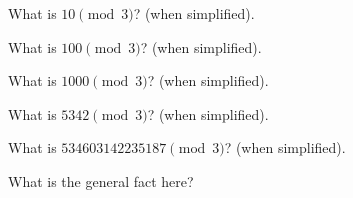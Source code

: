 \mbox{}
  \begin{myenum}
  \item What is $10 \pmod{3}$? (when simplified).
  \item What is $100 \pmod{3}$? (when simplified).
  \item What is $1000 \pmod{3}$? (when simplified).
  \item What is $5342 \pmod{3}$? (when simplified).  
  \item What is $534603142235187 \pmod{3}$? (when simplified).
  \item What is the general fact here?
  \end{myenum}
